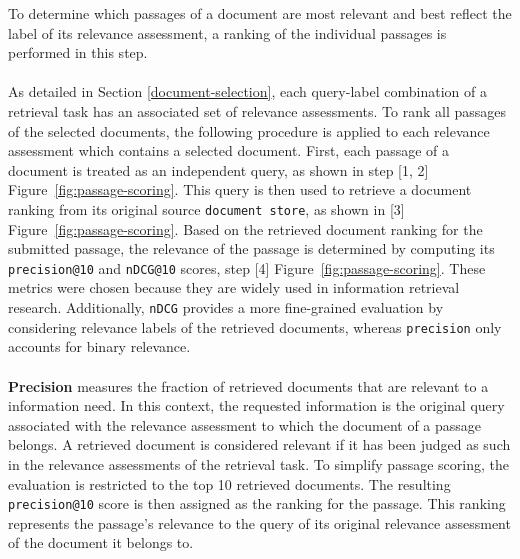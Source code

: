 To determine which passages of a document are most relevant and best reflect the label of its relevance assessment, a ranking of the individual passages is performed in this step.
\\\\
As detailed in Section \ref{document-selection}, each query-label combination of a retrieval task has an associated set of relevance assessments. To rank all passages of the selected documents, the following procedure is applied to each relevance assessment which contains a selected document. First, each passage of a document is treated as an independent query, as shown in step [1, 2] Figure~\ref{fig:passage-scoring}. This query is then used to retrieve a document ranking from its original source \texttt{document store}, as shown in [3] Figure~\ref{fig:passage-scoring}. Based on the retrieved document ranking for the submitted passage, the relevance of the passage is determined by computing its \texttt{precision@10} and \texttt{nDCG@10} scores, step [4] Figure~\ref{fig:passage-scoring}. These metrics were chosen because they are widely used in information retrieval research. Additionally, \texttt{nDCG} provides a more fine-grained evaluation by considering relevance labels of the retrieved documents, whereas \texttt{precision} only accounts for binary relevance.
\\\\
\textbf{Precision} measures the fraction of retrieved documents that are relevant to a information need. In this context, the requested information is the original query associated with the relevance assessment to which the document of a passage belongs. A retrieved document is considered relevant if it has been judged as such in the relevance assessments of the retrieval task. To simplify passage scoring, the evaluation is restricted to the top 10 retrieved documents. The resulting \texttt{precision@10} score is then assigned as the ranking for the passage. This ranking represents the passage's relevance to the query of its original relevance assessment of the document it belongs to.
\\\\
